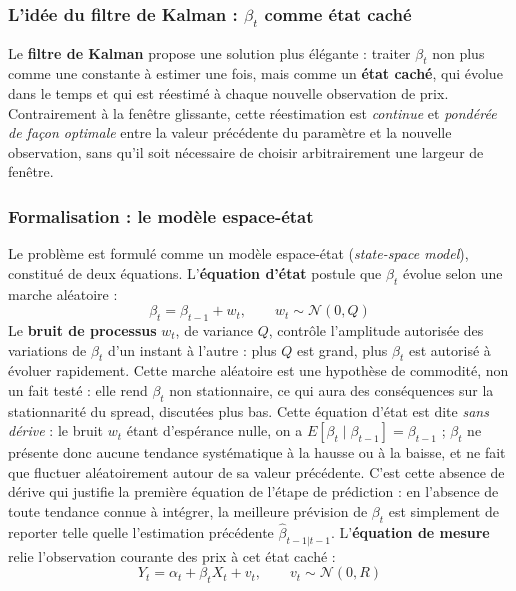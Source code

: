 \documentclass{article}
\begin{document}
\subsubsection*{L'idée du filtre de Kalman : $\beta_t$ comme état caché}
Le \textbf{filtre de Kalman} propose une solution plus élégante : traiter $\beta_t$ non plus comme une constante à estimer une fois, mais comme un \textbf{état caché}, qui évolue dans le temps et qui est réestimé à chaque nouvelle observation de prix. Contrairement à la fenêtre glissante, cette réestimation est \emph{continue} et \emph{pondérée de façon optimale}  entre la valeur précédente du paramètre et la nouvelle observation, sans qu'il soit nécessaire de choisir arbitrairement une largeur de fenêtre.
\subsubsection*{Formalisation : le modèle espace-état}
Le problème est formulé comme un modèle espace-état (\emph{state-space model}), constitué de deux équations. L'\textbf{équation d'état} postule que $\beta_t$ évolue selon une marche aléatoire :
\begin{equation}
\beta_t = \beta_{t-1} + w_t, \qquad w_t \sim \mathcal{N}(0, Q)
\end{equation}
Le \textbf{bruit de processus} $w_t$, de variance $Q$, contrôle l'amplitude autorisée des variations de $\beta_t$ d'un instant à l'autre : plus $Q$ est grand, plus $\beta_t$ est autorisé à évoluer rapidement. Cette marche aléatoire est une hypothèse de commodité, non un fait testé : elle rend $\beta_t$ non stationnaire, ce qui aura des conséquences sur la stationnarité du spread, discutées plus bas.
Cette équation d'état est dite \emph{sans dérive} : le bruit $w_t$ étant d'espérance nulle, on a $E[\beta_t \mid \beta_{t-1}] = \beta_{t-1}$ ; $\beta_t$ ne présente donc aucune tendance systématique à la hausse ou à la baisse, et ne fait que fluctuer aléatoirement autour de sa valeur précédente. C'est cette absence de dérive qui justifie la première équation de l'étape de prédiction : en l'absence de toute tendance connue à intégrer, la meilleure prévision de $\beta_t$ est simplement de reporter telle quelle l'estimation précédente $\hat\beta_{t-1|t-1}$.
L'\textbf{équation de mesure} relie l'observation courante des prix à cet état caché :
\begin{equation}
Y_t = \alpha_t + \beta_t X_t + v_t, \qquad v_t \sim \mathcal{N}(0, R)
\end{equation}
\end{document}
